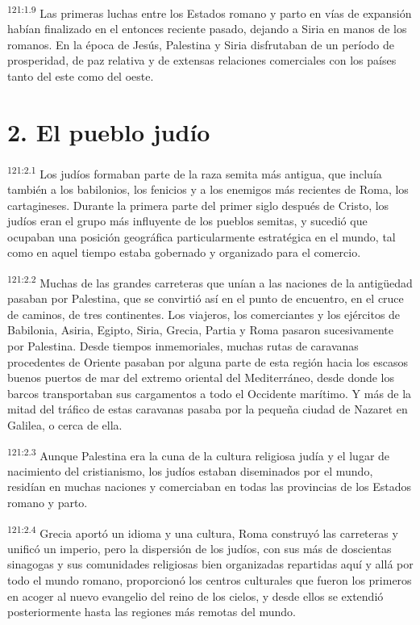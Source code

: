 \par 
\textsuperscript{121:1.9} Las primeras luchas entre los Estados romano y parto en vías de expansión habían finalizado en el entonces reciente pasado, dejando a Siria en manos de los romanos. En la época de Jesús, Palestina y Siria disfrutaban de un período de prosperidad, de paz relativa y de extensas relaciones comerciales con los países tanto del este como del oeste.

\section*{2. El pueblo judío}
\par 
\textsuperscript{121:2.1} Los judíos formaban parte de la raza semita más antigua, que incluía también a los babilonios, los fenicios y a los enemigos más recientes de Roma, los cartagineses. Durante la primera parte del primer siglo después de Cristo, los judíos eran el grupo más influyente de los pueblos semitas, y sucedió que ocupaban una posición geográfica particularmente estratégica en el mundo, tal como en aquel tiempo estaba gobernado y organizado para el comercio.

\par 
\textsuperscript{121:2.2} Muchas de las grandes carreteras que unían a las naciones de la antig\"uedad pasaban por Palestina, que se convirtió así en el punto de encuentro, en el cruce de caminos, de tres continentes. Los viajeros, los comerciantes y los ejércitos de Babilonia, Asiria, Egipto, Siria, Grecia, Partia y Roma pasaron sucesivamente por Palestina. Desde tiempos inmemoriales, muchas rutas de caravanas procedentes de Oriente pasaban por alguna parte de esta región hacia los escasos buenos puertos de mar del extremo oriental del Mediterráneo, desde donde los barcos transportaban sus cargamentos a todo el Occidente marítimo. Y más de la mitad del tráfico de estas caravanas pasaba por la pequeña ciudad de Nazaret en Galilea, o cerca de ella.

\par 
\textsuperscript{121:2.3} Aunque Palestina era la cuna de la cultura religiosa judía y el lugar de nacimiento del cristianismo, los judíos estaban diseminados por el mundo, residían en muchas naciones y comerciaban en todas las provincias de los Estados romano y parto.

\par 
\textsuperscript{121:2.4} Grecia aportó un idioma y una cultura, Roma construyó las carreteras y unificó un imperio, pero la dispersión de los judíos, con sus más de doscientas sinagogas y sus comunidades religiosas bien organizadas repartidas aquí y allá por todo el mundo romano, proporcionó los centros culturales que fueron los primeros en acoger al nuevo evangelio del reino de los cielos, y desde ellos se extendió posteriormente hasta las regiones más remotas del mundo.

